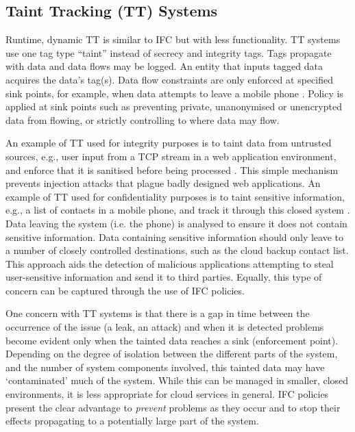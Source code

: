 \documentclass[10pt,journal,compsoc]{IEEEtran}
\begin{document}
\subsection{Taint Tracking (TT) Systems} 
Runtime, dynamic TT is similar to IFC but with less functionality. TT systems use one tag type ``taint'' instead of secrecy and integrity tags. Tags propagate with data and data flows may be logged.
An entity that inputs tagged data acquires the data's tag(s). Data flow constraints are only enforced at specified sink points, for example, when data 
attempts to leave a mobile phone \cite{Enck:2010:TIT:1924943.1924971}. Policy is applied at sink points such as preventing private, unanonymised or unencrypted data from flowing, or strictly controlling to where data may flow.



An example of TT used for integrity purposes is to taint data from untrusted sources, e.g., user input from a TCP stream in a web application environment, and enforce that it is sanitised before being processed \cite{papagiannis2011php}. 
This simple mechanism prevents injection attacks that plague badly designed web applications.
An example of TT used for confidentiality purposes is to taint sensitive information, e.g., a list of contacts in a mobile phone, and track it through this closed system \cite{Enck:2010:TIT:1924943.1924971}. Data leaving the system (i.e. the phone) is analysed to ensure it does not contain sensitive information. Data containing sensitive information should only leave to a number of closely controlled destinations, such as the cloud backup contact list. This approach aids the detection of malicious applications attempting to steal user-sensitive information and send it to third parties.
Equally, this type of concern can be captured through the use of IFC policies.







One concern with TT systems is that there is a gap in time between the occurrence of the issue (\eg a leak, an attack) and when it is detected \cite{Schwartz2010}
\ie problems become evident only when the tainted data reaches a sink (enforcement point). 
Depending on the degree of isolation between the different parts of the system, and the number of system components involved, this tainted data may have `contaminated' much of the system.
While this can be managed in smaller, closed environments, it is less appropriate for cloud services in general.
IFC policies present the clear advantage to \emph{prevent} problems as they occur and to stop their effects propagating to a potentially large part of the system.
\end{document}
